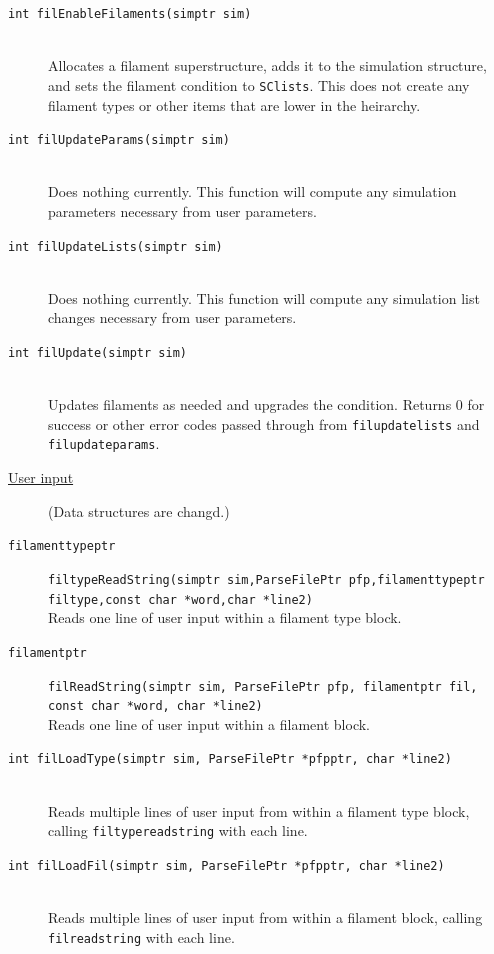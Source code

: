 \documentclass {scrbook}
\newcommand {\ttt} {\texttt}
\begin{document}
\begin{description}
\item[\ttt{int filEnableFilaments(simptr sim)}]
\hfill \\
Allocates a filament superstructure, adds it to the simulation structure, and sets the filament condition to \ttt{SClists}. This does not create any filament types or other items that are lower in the heirarchy.

\item[\ttt{int filUpdateParams(simptr sim)}]
\hfill \\
Does nothing currently. This function will compute any simulation parameters necessary from user parameters.

\item[\ttt{int filUpdateLists(simptr sim)}]
\hfill \\
Does nothing currently. This function will compute any simulation list changes necessary from user parameters.

\item[\ttt{int filUpdate(simptr sim)}]
\hfill \\
Updates filaments as needed and upgrades the condition. Returns 0 for success or other error codes passed through from \ttt{filupdatelists} and \ttt{filupdateparams}.


\item[\underline{User input}]
(Data structures are changd.)

\item[\ttt{filamenttypeptr}]
\ttt{filtypeReadString(simptr sim,ParseFilePtr pfp,filamenttypeptr filtype,const char *word,char *line2)}
\hfill \\
Reads one line of user input within a filament type block.

\item[\ttt{filamentptr}]
\ttt{filReadString(simptr sim, ParseFilePtr pfp, filamentptr fil, const char *word, char *line2)}
\hfill \\
Reads one line of user input within a filament block.

\item[\ttt{int filLoadType(simptr sim, ParseFilePtr *pfpptr, char *line2)}]
\hfill \\
Reads multiple lines of user input from within a filament type block, calling \ttt{filtypereadstring} with each line.

\item[\ttt{int filLoadFil(simptr sim, ParseFilePtr *pfpptr, char *line2)}]
\hfill \\
Reads multiple lines of user input from within a filament block, calling \ttt{filreadstring} with each line.



\end{description}
\end{document}
